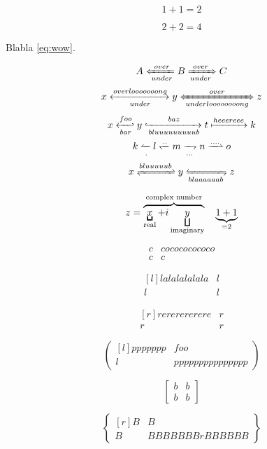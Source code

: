\documentclass{article}
\newcommand{\horz}{\noindent\makebox[\linewidth]{\rule{\paperwidth}{0.4pt}}}
\begin{document}
\horz

\begin{equation*}
1+1=2 \label{eq:much}
\end{equation*}

\begin{equation*}
2+2=4 \label{eq:wow}
\end{equation*}

Blabla \eqref{eq:wow}.

\horz

\[
A \xLeftarrow[under]{over} B \xRightarrow[under]{over} C
\]
\[
x \xleftrightarrow[under]{overlooooooong} y \xLeftrightarrow[underloooooooong]{over} z
\]
\[
x \xhookleftarrow[bar]{foo} y \xhookrightarrow[bluuuuuuuuub]{baz} t \xmapsto{heeereee} k
\]
\[
k \xleftharpoonup[.]{} l \xleftharpoondown{..} m \xrightharpoondown[...]{} n \xrightharpoonup{....} o
\]
\[
x \xrightleftharpoons{bluuuuub} y \xleftrightharpoons[blaaaaaab]{} z
\]

\horz

\[
z = \LaTeXoverbrace{
   \underbracket{x}_\text{real} + i
      \underbracket[1pt][7pt]{y}_\text{imaginary}
        }^\text{complex number}
\quad
\underbrace{1+1}_{=2}
\]

\horz

\[
\begin{matrix*}
c & cocococococo \\
c & c
\end{matrix*}
\]

\[
\begin{matrix*}[l]
lalalalalala & l \\
l & l
\end{matrix*}
\]

\[
\begin{matrix*}[r]
rererererere & r \\
r & r
\end{matrix*}
\]

\horz

\[
\begin{pmatrix*}[l]
ppppppp & foo \\
l & ppppppppppppppp
\end{pmatrix*}
\]

\[
\begin{bmatrix*}
b & b \\
b & b
\end{bmatrix*}
\]

\[
\begin{Bmatrix*}[r]
B & B \\
B & BBBBBBBrBBBBBB
\end{Bmatrix*}
\]
\end{document}

